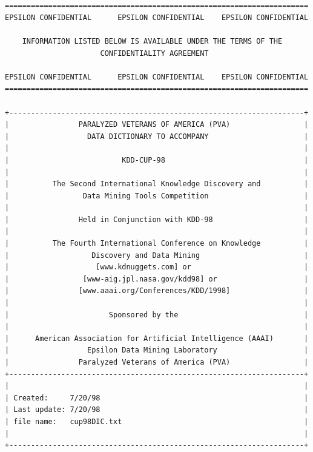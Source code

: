 \documentclass[
  11pt,
  a4paper,
  DIV=12,captions=tableheading,oneside,titlepage=firstiscover,abstracton]{scrreprt}
\begin{document}
\begin{verbatim}


======================================================================
EPSILON CONFIDENTIAL      EPSILON CONFIDENTIAL    EPSILON CONFIDENTIAL

    INFORMATION LISTED BELOW IS AVAILABLE UNDER THE TERMS OF THE  
                      CONFIDENTIALITY AGREEMENT                

EPSILON CONFIDENTIAL      EPSILON CONFIDENTIAL    EPSILON CONFIDENTIAL
======================================================================

+--------------------------------------------------------------------+
|                PARALYZED VETERANS OF AMERICA (PVA)                 |
|                  DATA DICTIONARY TO ACCOMPANY                      |
|                                                                    |
|                          KDD-CUP-98                                |
|                                                                    |
|          The Second International Knowledge Discovery and          |
|                 Data Mining Tools Competition                      |
|                                                                    |
|                Held in Conjunction with KDD-98                     |
|                                                                    |
|          The Fourth International Conference on Knowledge          |
|                   Discovery and Data Mining                        |
|                    [www.kdnuggets.com] or                          |
|                 [www-aig.jpl.nasa.gov/kdd98] or                    |
|                [www.aaai.org/Conferences/KDD/1998]                 |
|                                                                    |
|                       Sponsored by the                             |
|                                                                    |
|      American Association for Artificial Intelligence (AAAI)       |
|                  Epsilon Data Mining Laboratory                    |
|                Paralyzed Veterans of America (PVA)                 |
+--------------------------------------------------------------------+
|                                                                    |
| Created:     7/20/98                                               |
| Last update: 7/20/98                                               |
| file name:   cup98DIC.txt                                          |
|                                                                    |
+--------------------------------------------------------------------+


\end{verbatim}
\end{document}
